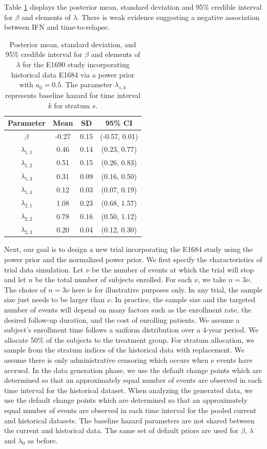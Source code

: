 Table \ref{coefficients} displays the posterior mean, standard deviation and 95\% credible interval for $\beta$ and elements of $\lambda$. There is weak evidence
suggesting a negative association between IFN and time-to-relapse.

\begin{table}[H]
\centering
\begin{tabular}{cccc}
\hline
Parameter & Mean & SD  & 95\% CI \\
\hline
$\beta$ & -0.27 & 0.15 & (-0.57, 0.01)\\
$\lambda_{1,1}$ & 0.46 & 0.14 & (0.23, 0.77) \\
$\lambda_{1,2}$ & 0.51 & 0.15 & (0.26, 0.83) \\
$\lambda_{1,3}$ & 0.31 & 0.09 & (0.16, 0.50)\\
$\lambda_{1,4}$ & 0.12 & 0.03 & (0.07, 0.19) \\
$\lambda_{2,1}$ & 1.08 & 0.23 & (0.68, 1.57) \\
$\lambda_{2,2}$ & 0.78 & 0.16 & (0.50, 1.12) \\
$\lambda_{2,3}$ & 0.20 & 0.04 & (0.12, 0.30) \\
\hline
\end{tabular}
\caption{Posterior mean, standard deviation, and 95\% credible interval for $\beta$ and elements of $\lambda$ for the E1690 study incorporating historical data E1684 via a power prior with $a_0=0.5$. The parameter $\lambda_{s,k}$ represents baseline hazard for time interval $k$ for stratum $s$.}
\label{coefficients}
\end{table}

Next, our goal is to design a new trial incorporating the E1684 study using the power prior and the normalized power prior. We first specify the characteristics of trial data simulation. Let $\nu$ be the number of events at which the trial will stop and let $n$ be the total number of subjects enrolled. For each $\nu$, we take $n = 3\nu$. The choice of $n = 3\nu$ here is for illustrative purposes only. In any trial, the sample size just needs to be larger than $\nu$. In practice, the sample size and the targeted number of events will depend on many factors such as the enrollment rate, the desired follow-up duration, and the cost of enrolling patients. We assume a subject's enrollment time follows a uniform distribution over a 4-year period. We allocate 50\% of the subjects to the treatment group. For stratum allocation, we sample from the stratum indices of the historical data with replacement. We assume there is only administrative censoring which occurs when $\nu$ events have accrued. In the data generation phase, we use the default change points which are determined so that an approximately equal number of events are observed in each time interval for the historical dataset. When analyzing the generated data, we use the default change points which are determined so that an approximately equal number of events are observed in each time interval for the pooled current and historical datasets. The baseline hazard parameters are not shared between the current and historical data. The same set of default priors are used for $\beta$, $\lambda$ and $\lambda_0$ as before.

